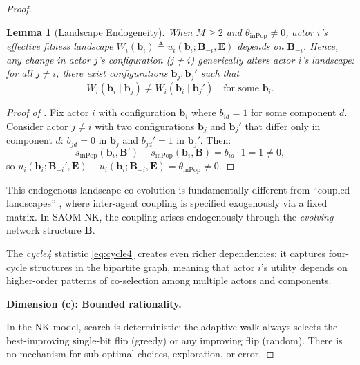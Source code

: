 \documentclass[12pt]{article}
\newtheorem{lemma}{Lemma}
\newcommand{\bb}{\mathbf{b}}
\newcommand{\bB}{\mathbf{B}}
\newcommand{\bE}{\mathbf{E}}
\begin{document}
\begin{proof}
\begin{lemma}[Landscape Endogeneity]
\label{lem:landscape_endogeneity}
When $M \geq 2$ and $\theta_{\mathrm{inPop}} \neq 0$, actor $i$'s effective
fitness landscape $\tilde{W}_i(\bb_i) \triangleq u_i(\bb_i; \bB_{-i}, \bE)$
depends on $\bB_{-i}$. Hence, any change in actor $j$'s configuration
($j \neq i$) generically alters actor $i$'s landscape: for all $j \neq i$,
there exist configurations $\bb_j, \bb_j'$ such that
\begin{equation*}
  \tilde{W}_i(\bb_i \mid \bb_j) \neq \tilde{W}_i(\bb_i \mid \bb_j')
  \quad\text{for some } \bb_i.
\end{equation*}
\end{lemma}

\begin{proof}[Proof of ]
Fix actor $i$ with configuration $\bb_i$ where $b_{id} = 1$ for some
component $d$. Consider actor $j \neq i$ with two configurations
$\bb_j$ and $\bb_j'$ that differ only in component $d$: $b_{jd} = 0$ in
$\bb_j$ and $b_{jd}' = 1$ in $\bb_j'$. Then:
\begin{equation*}
  s_{\mathrm{inPop}}(\bb_i, \bB') - s_{\mathrm{inPop}}(\bb_i, \bB)
  = b_{id} \cdot 1 = 1 \neq 0,
\end{equation*}
so $u_i(\bb_i; \bB_{-i}', \bE) - u_i(\bb_i; \bB_{-i}, \bE) =
\theta_{\mathrm{inPop}} \neq 0$.
\end{proof}

This endogenous landscape co-evolution is fundamentally different from
``coupled landscapes'' \citep{siggelkow2005speed, rivkin2007balancing},
where inter-agent coupling is specified exogenously via a fixed matrix. In
SAOM-NK, the coupling arises endogenously through the \emph{evolving}
network structure $\bB$.

The \emph{cycle4} statistic \eqref{eq:cycle4} creates even richer
dependencies: it captures four-cycle structures in the bipartite graph,
meaning that actor $i$'s utility depends on higher-order patterns of
co-selection among multiple actors and components.

\medskip
\noindent\textbf{Dimension (c): Bounded rationality.}

In the NK model, search is deterministic: the adaptive walk always selects the
best-improving single-bit flip (greedy) or any improving flip (random). There
is no mechanism for sub-optimal choices, exploration, or error.


\end{proof}
\end{document}

